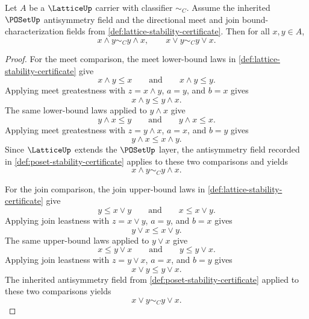 \begin{theorem}
\label{thm:lattice-commutativity-from-directional-bounds}
Let \(A\) be a \(\LatticeUp\) carrier with classifier \(\sim_C\). Assume the inherited \(\POSetUp\) antisymmetry field and the directional meet and join bound-characterization fields from \autoref{def:lattice-stability-certificate}. Then for all \(x,y\in A\),
$$
  x\wedge y\sim_C y\wedge x,
  \qquad
  x\vee y\sim_C y\vee x .
$$
\end{theorem}
\begin{proof}
For the meet comparison, the meet lower-bound laws in \autoref{def:lattice-stability-certificate} give
$$
  x\wedge y\le x
  \qquad\text{and}\qquad
  x\wedge y\le y .
$$
Applying meet greatestness with \(z=x\wedge y\), \(a=y\), and \(b=x\) gives
$$
  x\wedge y\le y\wedge x .
$$
The same lower-bound laws applied to \(y\wedge x\) give
$$
  y\wedge x\le y
  \qquad\text{and}\qquad
  y\wedge x\le x .
$$
Applying meet greatestness with \(z=y\wedge x\), \(a=x\), and \(b=y\) gives
$$
  y\wedge x\le x\wedge y .
$$
Since \(\LatticeUp\) extends the \(\POSetUp\) layer, the antisymmetry field recorded in \autoref{def:poset-stability-certificate} applies to these two comparisons and yields
$$
  x\wedge y\sim_C y\wedge x .
$$

For the join comparison, the join upper-bound laws in \autoref{def:lattice-stability-certificate} give
$$
  y\le x\vee y
  \qquad\text{and}\qquad
  x\le x\vee y .
$$
Applying join leastness with \(z=x\vee y\), \(a=y\), and \(b=x\) gives
$$
  y\vee x\le x\vee y .
$$
The same upper-bound laws applied to \(y\vee x\) give
$$
  x\le y\vee x
  \qquad\text{and}\qquad
  y\le y\vee x .
$$
Applying join leastness with \(z=y\vee x\), \(a=x\), and \(b=y\) gives
$$
  x\vee y\le y\vee x .
$$
The inherited antisymmetry field from \autoref{def:poset-stability-certificate} applied to these two comparisons yields
$$
  x\vee y\sim_C y\vee x .
$$
\end{proof}

